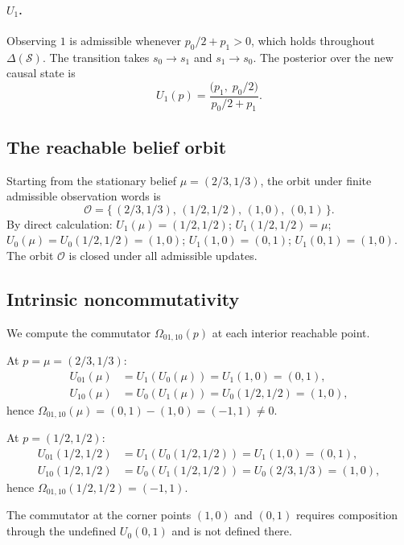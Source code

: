 \documentclass[11pt,a4paper]{article}
\theoremstyle{plain}
\theoremstyle{definition}
\theoremstyle{remark}
\newcommand{\States}{\mathcal{S}}
\begin{document}
\paragraph{$U_1$.} Observing $1$ is admissible whenever $p_0/2 + p_1 > 0$, which holds throughout $\Delta(\States)$. The transition takes $s_0 \to s_1$ and $s_1 \to s_0$. The posterior over the new causal state is
\begin{equation}
    U_1(p) = \frac{\bigl(p_1,\; p_0/2\bigr)}{p_0/2 + p_1}.
    \label{eq:u1-even}
\end{equation}

\subsection{The reachable belief orbit}

Starting from the stationary belief $\mu = (2/3, 1/3)$, the orbit under finite admissible observation words is
\begin{equation}
    \mathcal{O} = \bigl\{\, (2/3, 1/3),\, (1/2, 1/2),\, (1, 0),\, (0, 1) \,\bigr\}.
\end{equation}
By direct calculation: $U_1(\mu) = (1/2, 1/2)$; $U_1(1/2, 1/2) = \mu$; $U_0(\mu) = U_0(1/2, 1/2) = (1, 0)$; $U_1(1, 0) = (0, 1)$; $U_1(0, 1) = (1, 0)$. The orbit $\mathcal{O}$ is closed under all admissible updates.

\subsection{Intrinsic noncommutativity}

We compute the commutator $\Omega_{01, 10}(p)$ at each interior reachable point.

At $p = \mu = (2/3, 1/3)$:
\begin{align}
    U_{01}(\mu) &= U_1(U_0(\mu)) = U_1(1, 0) = (0, 1), \\
    U_{10}(\mu) &= U_0(U_1(\mu)) = U_0(1/2, 1/2) = (1, 0),
\end{align}
hence $\Omega_{01,10}(\mu) = (0, 1) - (1, 0) = (-1, 1) \neq 0$.

At $p = (1/2, 1/2)$:
\begin{align}
    U_{01}(1/2, 1/2) &= U_1(U_0(1/2, 1/2)) = U_1(1, 0) = (0, 1), \\
    U_{10}(1/2, 1/2) &= U_0(U_1(1/2, 1/2)) = U_0(2/3, 1/3) = (1, 0),
\end{align}
hence $\Omega_{01,10}(1/2, 1/2) = (-1, 1)$.

The commutator at the corner points $(1, 0)$ and $(0, 1)$ requires composition through the undefined $U_0(0, 1)$ and is not defined there.
\end{document}
